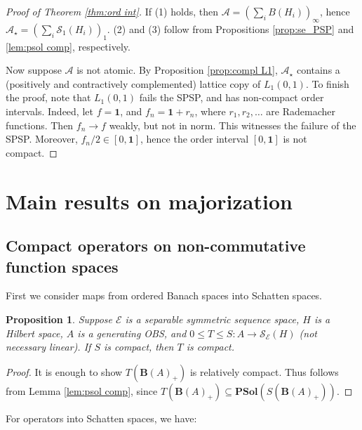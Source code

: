 \documentclass[12pt]{amsart}
\theoremstyle{plain}
\newtheorem{proposition}[theorem]{Proposition}
\theoremstyle{definition}
\newcommand{\one}{\mathbf{1}}
\newcommand{\is}{\mathcal S}
\newcommand{\ce}{\mathcal E}
\newcommand{\se}{{\mathcal S}_{\mathcal{E}}}
\newcommand{\ball}{\mathbf{B}}
\newcommand{\A}{\mathcal{A}}
\newcommand{\psol}{\mathbf{PSol}}
\begin{document}
\begin{proof}[Proof of Theorem \ref{thm:ord int}]
If (1) holds, then $\A = (\sum_i B(H_i))_\infty$, hence
$\A_\star = (\sum_i \is_1(H_i))_1$.
(2) and (3) follow from Propositions \ref{prop:se_PSP} and
\ref{lem:psol comp}, respectively.

Now suppose $\A$ is not atomic. By Proposition \ref{prop:compl L1},
$\A_\star$ contains a (positively and contractively complemented) lattice copy of $L_1(0,1)$.
To finish the proof, note that $L_1(0,1)$ fails the
SPSP, and has non-compact order intervals. Indeed, let $f = \one$, and
$f_n = \one + r_n$, where $r_1, r_2, \ldots$ are Rademacher functions.
Then $f_n \to f$ weakly, but not in norm. This witnesses the failure of
the SPSP. Moreover, $f_n/2 \in [0,\one]$, hence the order interval
$[0,\one]$ is not compact.
\end{proof}



\section{Main results on majorization}\label{sec:main}



\subsection{Compact operators on non-commutative function spaces}\label{ss:schatten_main}


First we consider maps from ordered Banach spaces into Schatten spaces.

\begin{proposition}\label{prop:compact2}
Suppose $\ce$ is a separable symmetric sequence space, $H$ is a Hilbert space,
$A$ is a generating OBS, and $0 \le T \le S: A \to \se(H)$
(not necessary linear).  If $S$ is compact, then $T$ is compact.
\end{proposition}

\begin{proof}
It is enough to show $T(\ball(A)_+)$ is relatively compact. Thus follows from
Lemma \ref{lem:psol comp}, since $T(\ball(A)_+) \subseteq \psol(S(\ball(A)_+))$.
\end{proof}


For operators into Schatten spaces, we have:
\end{document}

